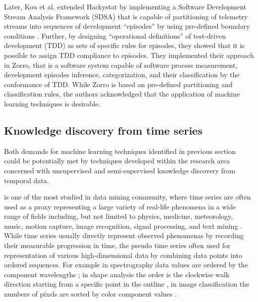 Later, Kou et al. extended Hackystat by implementing a Software Development Stream Analysis Framework (SDSA) 
that is capable of partitioning of telemetry streams into sequences of development ``episodes'' by using pre-defined 
boundary conditions \cite{citeulike:6180831} \cite{citeulike:11538873}.
Further, by designing ``operational definitions'' of test-driven development (TDD) as sets of specific rules for 
episodes, they showed that it is possible to assign TDD compliance to episodes.
They implemented their approach in Zorro, that is a software system capable of software process measurement, 
development episodes inference, categorization, and their classification by the conformance of TDD. While Zorro is 
based on pre-defined partitioning and classification rules, the authors acknowledged that the application of machine 
learning techniques is desirable.

%
%
\subsection{Knowledge discovery from time series}
Both demands for machine learning techniques identified in previous section could be potentially met by techniques 
developed within the research area concerned with unsupervised and semi-supervised knowledge discovery from 
temporal data. 

is one of the most studied 
in data mining community, where time series are often used as a proxy representing a large variety of real-life 
phenomena in a wide range of fields including, but not limited to physics, medicine, meteorology, music, 
motion capture, image recognition, signal processing, and text mining \cite{citeulike:11796594}. 
While time series usually directly represent observed phenomenas by recording their measurable progression in time, 
the pseudo time series often used for representation of various high-dimensional data by combining data points into 
ordered sequences. 
For example in spectrography data values are ordered by the component wavelengths \cite{citeulike:12550833};
in shape analysis the order is the clockwise walk direction starting from a specific point in the outline 
\cite{citeulike:12550835}, in image classification the numbers of pixels are sorted by color component 
values \cite{citeulike:2900542}.

